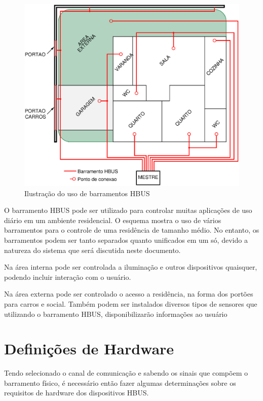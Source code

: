 \documentclass[11pt]{report}
\begin{document}
\begin{figure}[H]
\centering
\includegraphics[scale=0.6]{../media/hbus_house.ps}
\caption{Ilustração do uso de barramentos HBUS}
\end{figure}

O barramento HBUS pode ser utilizado para controlar muitas aplicações de uso diário em um ambiente residencial. O esquema mostra o uso de vários barramentos para o controle de uma residência de tamanho médio. No entanto, os barramentos podem ser tanto separados quanto unificados em um só, devido a natureza do sistema que será discutida neste documento.

Na área interna pode ser controlada a iluminação e outros dispositivos quaisquer, podendo incluir interação com o usuário.

Na área externa pode ser controlado o acesso a residência, na forma dos portões para carros e social. Também podem ser instalados diversos tipos de sensores que utilizando o barramento HBUS, disponibilizarão informações ao usuário

\chapter{Definições de Hardware}

Tendo selecionado o canal de comunicação e sabendo os sinais que compõem o barramento físico, é necessário então fazer algumas determinações sobre os requisitos de hardware dos dispositivos HBUS.
\end{document}
